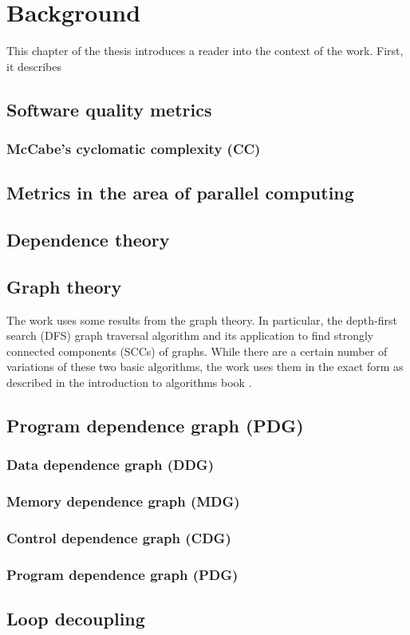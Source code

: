 \chapter{Background} \label{backgroud}

\qquad This chapter of the thesis introduces a reader into the context of the work. First, it describes  

\section{Software quality metrics} \label{background-software-quality-metrics}

\subsection{McCabe's cyclomatic complexity (CC)}
\cite{cyclomatic-complexity}

\section{Metrics in the area of parallel computing}

\section{Dependence theory} \label{background-dependence-theory}
\cite{optimizing-compilers-book}

\section{Graph theory} \label{background-graph-theory}
\qquad The work uses some results from the graph theory. In particular, the depth-first search (DFS) graph traversal algorithm and its application to find strongly connected components (SCCs) of graphs. While there are a certain number of variations of these two basic algorithms, the work uses them in the exact form as described in the introduction to algorithms book \cite{introduction-to-algorithms-book}.

\section{Program dependence graph (PDG)}

\cite{pdg}

\subsection{Data dependence graph (DDG)} \label{background-ddg}
\subsection{Memory dependence graph (MDG)} \label{background-mdg}
\subsection{Control dependence graph (CDG)} \label{background-cdg}
\subsection{Program dependence graph (PDG)} \label{background-pdg}

\section{Loop decoupling} \label{background-loop-decoupling}

\cite{iterator-recognition}